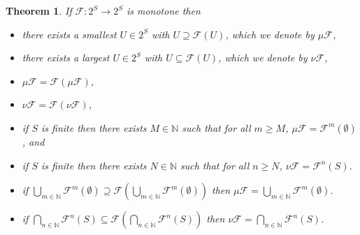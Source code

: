 \documentclass[12pt]{article}
\newtheorem{theorem}{Theorem}
\theoremstyle{definition}
\begin{document}
\begin{theorem}
\label{theorem:knaster-tarski}
If $\mathcal{F} : 2^S \to 2^S$ is monotone then
\begin{itemize}
\item[(a)]
there exists a smallest $U \in 2^S$ with $U \supseteq \mathcal{F}(U)$, which we denote by $\mu \mathcal{F}$,
\item[(b)]
there exists a largest $U \in 2^S$ with $U \subseteq \mathcal{F}(U)$, which we denote by $\nu \mathcal{F}$,
\item[(c)]
$\mu \mathcal{F} = \mathcal{F}(\mu \mathcal{F})$,
\item[(d)]
$\nu \mathcal{F} = \mathcal{F}(\nu \mathcal{F})$,
\item[(e)]
if $S$ is finite then there exists $M \in \mathbb{N}$ such that for all $m \geq M$, $\mu \mathcal{F} = \mathcal{F}^m(\emptyset)$, and
\item[(f)]
if $S$ is finite then there exists $N \in \mathbb{N}$ such that for all $n \geq N$, $\nu \mathcal{F} = \mathcal{F}^n(S)$.
\item[(g)]
if $\bigcup_{m \in \mathbb{N}} \mathcal{F}^m(\emptyset) \supseteq \mathcal{F}(\bigcup_{m \in \mathbb{N}} \mathcal{F}^m(\emptyset))$ then $\mu \mathcal{F} = \bigcup_{m \in \mathbb{N}} \mathcal{F}^m(\emptyset)$.
\item[(h)]
if $\bigcap_{n \in \mathbb{N}} \mathcal{F}^n(S) \subseteq \mathcal{F}(\bigcap_{n \in \mathbb{N}} \mathcal{F}^n(S))$ then $\nu \mathcal{F} = \bigcap_{n \in \mathbb{N}} \mathcal{F}^n(S)$.
\end{itemize}
\end{theorem}
\end{document}
